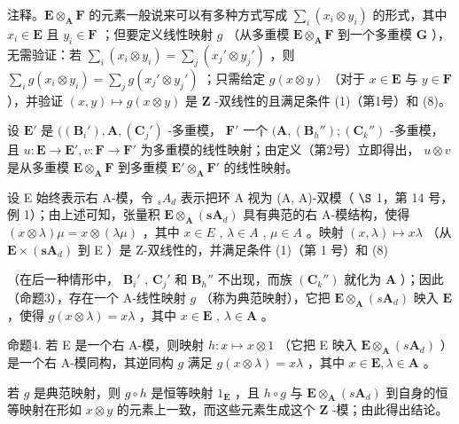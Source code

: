 注释。\(\mathbf{E} \otimes_{\mathbf{A}} \mathbf{F}\) 的元素一般说来可以有多种方式写成 \(\sum_{i} (x_i \otimes y_i)\) 的形式，其中 \(x_i \in \mathbf{E}\) 且 \(y_i \in \mathbf{F}\) ；但要定义线性映射 \(g\) （从多重模 \(\mathbf{E} \otimes_{\mathbf{A}} \mathbf{F}\) 到一个多重模 \(\mathbf{G}\) ），无需验证：若 \(\sum_{i} (x_i \otimes y_i) = \sum_{j} (x_j' \otimes y_j')\) ，则 \(\sum_{i} g(x_i \otimes y_i) = \sum_{j} g(x_j' \otimes y_j')\) ；只需给定 \(g(x \otimes y)\) （对于 \(x \in \mathbf{E}\) 与 \(y \in \mathbf{F}\) ），并验证 \((x, y) \mapsto g(x \otimes y)\) 是 \(\mathbf{Z}\) -双线性的且满足条件 (1)（第1号）和 (8)。

设 \(\mathbf{E}'\) 是 \(((\mathbf{B}_i'),\mathbf{A},(\mathbf{C}_j')\) -多重模， \(\mathbf{F}'\) 一个 \((\mathbf{A},(\mathbf{B}_h'');(\mathbf{C}_k'')\) -多重模，且 \(u:\mathbf{E}\to \mathbf{E}',v:\mathbf{F}\to \mathbf{F}'\) 为多重模的线性映射；由定义（第2号）立即得出， \(u\otimes v\) 是从多重模 \(\mathbf{E}\otimes_{\mathbf{A}}\mathbf{F}\) 到多重模 \(\mathbf{E}'\otimes_{\mathbf{A}}\mathbf{F}'\) 的线性映射。

设 E 始终表示右 A-模，令 \(_{s}A_{d}\) 表示把环 A 视为 (A, A)-双模（ \(\S\) 1，第 14 号，例 1）；由上述可知，张量积 \(\mathbf{E} \otimes_{\mathbf{A}} (\mathbf{s}\mathbf{A}_{d})\) 具有典范的右 A-模结构，使得 \((x \otimes \lambda)\mu = x \otimes (\lambda\mu)\) ，其中 \(x \in E\) , \(\lambda \in A\) , \(\mu \in A\) 。映射 \((x, \lambda) \mapsto x\lambda\) （从 \(\mathbf{E} \times (\mathbf{s}\mathbf{A}_{d})\) 到 E ）是 Z-双线性的，并满足条件 (1)（第 1 号）和 (8)

（在后一种情形中， \(\mathbf{B}_i'\) , \(\mathbf{C}_j'\) 和 \(\mathbf{B}_h''\) 不出现，而族 \((\mathbf{C}_k'')\) 就化为 \(\mathbf{A}\) ）；因此（命题3），存在一个 A-线性映射 \(g\) （称为典范映射），它把 \(\mathbf{E} \otimes_{\mathbf{A}} (s\mathbf{A}_d)\) 映入 \(\mathbf{E}\) ，使得 \(g(x \otimes \lambda) = x\lambda\) ，其中 \(x \in \mathbf{E}\) , \(\lambda \in \mathbf{A}\) 。

命题4. 若 E 是一个右 A-模，则映射 \(h: x \mapsto x \otimes 1\) （它把 E 映入 \(\mathbf{E} \otimes_{\mathbf{A}} (s\mathbf{A}_d)\) ）是一个右 A-模同构，其逆同构 \(g\) 满足 \(g(x \otimes \lambda) = x\lambda\) ，其中 \(x \in \mathbf{E}, \lambda \in \mathbf{A}\) 。

若 \(g\) 是典范映射，则 \(g \circ h\) 是恒等映射 \(1_{\mathbf{E}}\) ，且 \(h \circ g\) 与 \(\mathbf{E} \otimes_{\mathbf{A}} (s\mathbf{A}_d)\) 到自身的恒等映射在形如 \(x \otimes y\) 的元素上一致，而这些元素生成这个 \(\mathbf{Z}\) -模；由此得出结论。


